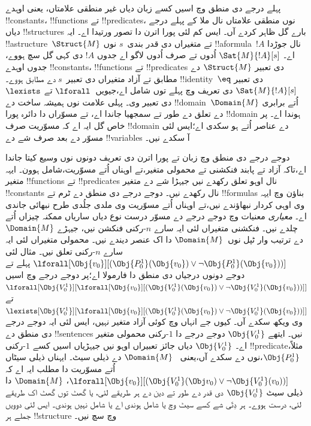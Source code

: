 \documentclass[../../../include/open-logic-section]{subfiles}
\begin{document}


پہلے درجے دی منطق وچ اسیں کسے زبان دیاں غیر منطقی
علامتاں، یعنی اوہدے !!{constant}s، !!{function}s تے
!!{predicate}s، نوں منطقی علامتاں نال ملا کے پہلے درجے
دیاں !!{structure}s بارے گل ظاہر کردے آں۔ ایس کم لئی پورا اترن دا تصور ورتیدا اے۔ ایہ !!a{structure}~$\Struct{M}$
تے متغیراں دی قدر بندی~$s$ نوں !!a{formula}~$!A$ نال جوڑدا اے۔
$\Sat{M}{!A}[s]$ اُدوں تے صرف اُدوں لاگو اے جدوں $!A$ دی کہی گل
سچ ہووے، جدوں اوہدے
!!{constant}s، !!{function}s تے !!{predicate}s دی
تعبیر $\Struct{M}$ دے مطابق تے آزاد متغیراں دی
تعبیر~$s$ دے مطابق ہووے۔ !!{identity}~$\eq$ دی
تعبیر $\Sat{M}{!A}[s]$ دی تعریف وچ پہلے توں شامل
اے،جیویں~$\lforall$ تے $\lexists$ دی تعبیر وی۔
پہلی علامت نوں ہمیشہ ساخت دے !!{domain}~$\Domain{M}$
اُتے برابری دے تعلق دے طور تے سمجھیا جاندا اے، تے مسوّراں دا دائرہ
پورا !!{domain} ہوندا اے۔ پر خاص گل ایہ اے کہ مسوّریت صرف
!!{domain} دے عناصر اُتے ہو سکدی اے؛ایس لئی مسوّر
دے بعد صرف شے دے !!{variable}s آ سکدے نیں۔

دوجے درجے دی منطق وچ زبان تے پورا اترن دی تعریف
دونوں نوں وسیع کیتا جاندا اے،تاکہ آزاد تے پابند
فنکشنی تے محمولی متغیر،تے اوہناں اُتے مسوّریت،شامل
ہوون۔ ایہہ متغیر !!{function}s تے !!{predicate}s نال اوہو تعلق رکھدے نیں
جیہڑا شے دے متغیر !!{constant}s نال رکھدے نیں۔ دوجے درجے دی
منطق دے ٹرم تے
!!{formula}s بناؤن وچ ایہہ وی اوہی کردار نبھاؤندے
نیں،تے اوہناں اُتے مسوّریت وی ملدی جلُدی طرح
نبھائی جاندی اے۔ \emph{معیاری} معنیات وچ دوجے درجے
دے مسوّر درست نوع دیاں ساریاں ممکنہ چیزاں اُتے
چلدے نیں۔ فنکشنی متغیراں لئی ایہ سارے $n$-رکنی فنکشن نیں،
جیہڑے $\Domain{M}$ دے ترتیب وار ٹپل نوں~$\Domain{M}$ دا اک
عنصر دیندے نیں۔ محمولی متغیراں لئی ایہ سارے $n$-رکنی تعلق نیں۔ مثال لئی
$\lforall[\Obj{v_0}][(\Obj{P^1_0}(\Obj{v_0}) \lor \lnot
  \Obj{P^1_0}(\Obj{v_0}))]$ پہلے تے دوجے دونوں درجیاں
دی منطق دا فارمولا اے؛پر دوجے درجے وچ اسیں
$\lforall[\Obj{V^1_0}][\lforall[\Obj{v_0}][(\Obj{V^1_0}(\Obj{v_0}) \lor
    \lnot \Obj{V^1_0}(\Obj{v_0}))]]$ تے
$\lexists[\Obj{V^1_0}][\lforall[\Obj{v_0}][(\Obj{V^1_0}(\Obj{v_0}) \lor
    \lnot \Obj{V^1_0}(\Obj{v_0}))]]$ وی ویکھ سکدے آں۔
کیوں جے انہاں وچ کوئی آزاد متغیر نہیں، ایس لئی ایہ دوجے درجے
دی منطق دے !!{sentence}s نیں۔ ایتھے $\Obj{V^1_0}$
دوجے درجے دا $1$-رکنی محمولی متغیر اے۔ $\Obj{V^1_0}$
دیاں جائز تعبیراں اوہو نیں جیہڑیاں اسیں کسے
$1$-رکنی !!{predicate}،مثلاً $\Obj{P^1_0}$،نوں دے
سکدے آں،یعنی
~$\Domain{M}$ دے ذیلی سیٹ۔ ایہناں ذیلی سیٹاں اُتے مسوّریت دا مطلب ایہ اے کہ $\lforall[\Obj{v_0}][(\Obj{V^1_0}(\Obj v_0) \lor \lnot
  \Obj{V^1_0}(v_0))]$، $\Domain{M}$ دا ذیلی سیٹ
$\Obj{V^1_0}$ دی قدر دے طور تے دین دے
ہر طریقے لئی، یا گھٹ توں گھٹ اک طریقے لئی، درست ہووے۔
ہر دِتّی شے کسے سیٹ وچ یا شامل ہوندی اے یا شامل نہیں ہوندی۔
ایس لئی دوویں جملے ہر
!!{structure} وچ سچ نیں۔
\end{document}
